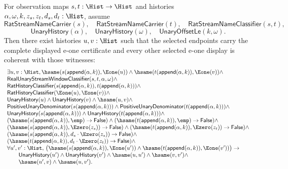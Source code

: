 \begin{theorem}
\label{thm:real-unary-streamname-finite-window-selected-canonical-e1-tail-full-package}
For observation maps $s,t:\Hist\to\Hist$ and histories
$\alpha,\omega,k,z_s,z_t,d_s,d_t:\Hist$, assume
$$
\mathsf{RatStreamNameCarrier}(s),\quad
\mathsf{RatStreamNameCarrier}(t),\quad
\mathsf{RatStreamNameClassifier}(s,t),
$$
$$
\mathsf{UnaryHistory}(\alpha),\quad
\mathsf{UnaryHistory}(\omega),\quad
\mathsf{UnaryOffsetLe}(k,\omega).
$$
Then there exist histories $u,v:\Hist$ such that the selected endpoints carry
the complete displayed e-one certificate and every other selected e-one display
is coherent with those witnesses:
$$
\begin{array}{l}
\exists u,v:\Hist,
\hsame(s(\mathsf{append}(\alpha,k)),\Eone(u))\land
\hsame(t(\mathsf{append}(\alpha,k)),\Eone(v))\land\\
\mathsf{RealUnaryStreamWindowClassifier}(s,t,\alpha,\omega)\land\\
\mathsf{RatHistoryClassifier}(s(\mathsf{append}(\alpha,k)),t(\mathsf{append}(\alpha,k)))\land\\
\mathsf{RatHistoryClassifier}(\Eone(u),\Eone(v))\land\\
\mathsf{UnaryHistory}(u)\land\mathsf{UnaryHistory}(v)\land\hsame(u,v)\land\\
\mathsf{PositiveUnaryDenominator}(s(\mathsf{append}(\alpha,k)))\land
\mathsf{PositiveUnaryDenominator}(t(\mathsf{append}(\alpha,k)))\land\\
\mathsf{UnaryHistory}(s(\mathsf{append}(\alpha,k)))\land
\mathsf{UnaryHistory}(t(\mathsf{append}(\alpha,k)))\land\\
(\hsame(s(\mathsf{append}(\alpha,k)),\emp)\to\mathsf{False})\land
(\hsame(t(\mathsf{append}(\alpha,k)),\emp)\to\mathsf{False})\land\\
(\hsame(s(\mathsf{append}(\alpha,k)),\Ezero(z_s))\to\mathsf{False})\land
(\hsame(t(\mathsf{append}(\alpha,k)),\Ezero(z_t))\to\mathsf{False})\land\\
(\hsame(s(\mathsf{append}(\alpha,k)),d_s\cdot\Ezero(z_s))\to
\mathsf{False})\land\\
(\hsame(t(\mathsf{append}(\alpha,k)),d_t\cdot\Ezero(z_t))\to
\mathsf{False})\land\\
\forall u',v':\Hist,\,
\bigl(\hsame(s(\mathsf{append}(\alpha,k)),\Eone(u'))\land
\hsame(t(\mathsf{append}(\alpha,k)),\Eone(v'))\bigr)\to\\
\qquad
\mathsf{UnaryHistory}(u')\land
\mathsf{UnaryHistory}(v')\land
\hsame(u,u')\land
\hsame(v,v')\land\\
\qquad
\hsame(u',v)\land
\hsame(u,v').
\end{array}
$$
\end{theorem}
